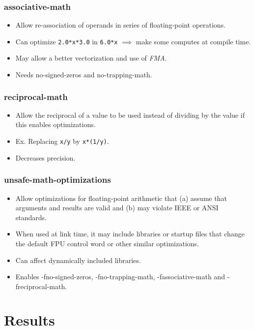 \documentclass{beamer}
\begin{document}
\begin{frame}[fragile]
    \frametitle{associative-math}

    \begin{itemize}
        \item Allow re-association of operands in series of floating-point operations.
        \item Can optimize \verb'2.0*x*3.0' in \verb'6.0*x' $\implies$ make some computes at compile time.
        \item May allow a better vectorization and use of \emph{FMA}.
        \item Needs no-signed-zeros and no-trapping-math.
    \end{itemize}
\end{frame}

\begin{frame}[fragile]
    \frametitle{reciprocal-math}

    \begin{itemize}
        \item Allow the reciprocal of a value to be used instead of dividing by the value if this enables optimizations.
        \item Ex. Replacing \verb'x/y' by \verb'x*(1/y)'.
        \item Decreases precision.
    \end{itemize}
\end{frame}

\begin{frame}[fragile]
    \frametitle{unsafe-math-optimizations}

    \begin{itemize}
        \item Allow optimizations for floating-point arithmetic that (a) assume that arguments and results are valid and (b) may violate IEEE or ANSI standards.
        \item When used at link time, it may include libraries or startup files that change the default FPU control word or other similar optimizations.
        \item Can affect dynamically included libraries.
        \item Enables -fno-signed-zeros, -fno-trapping-math, -fassociative-math and -freciprocal-math.
    \end{itemize}
\end{frame}

\section{Results}
\end{document}
